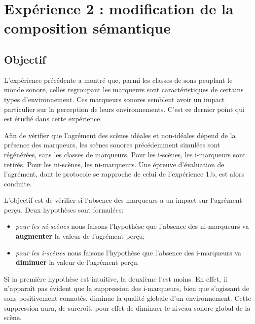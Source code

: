 \documentclass[twoside,twocolumn]{article}
\begin{document}

\section{Expérience 2 : modification de la composition sémantique}
\label{sec:xp3}

\subsection{Objectif} 

L'expérience précédente a montré que, parmi les classes de sons peuplant le monde sonore, celles regroupant les marqueurs sont caractéristiques de certains types d'environnement. Ces marqueurs sonores semblent avoir un impact particulier sur la perception de leurs environnements. C'est ce dernier point qui est étudié dans cette expérience.

Afin de vérifier que l'agrément des scènes idéales et non-idéales dépend de la présence des marqueurs, les scènes sonores précédemment simulées sont régénérées, sans les classes de marqueurs. Pour les i-scènes, les i-marqueurs sont retirés. Pour les ni-scènes, les ni-marqueurs. Une épreuve d'évaluation de l'agrément, dont le protocole se rapproche de celui de l'expérience 1.b, est alors conduite.

L'objectif est de vérifier si l'absence des marqueurs a un impact sur l'agrément perçu. Deux hypothèses sont formulées:

\begin{itemize}
\item \emph{pour les ni-scènes} nous faisons l'hypothèse que l'absence des ni-marqueurs va \textbf{augmenter} la valeur de l'agrément perçu;
\item \emph{pour les i-scènes} nous faisons l'hypothèse que l'absence des i-marqueurs va \textbf{diminuer} la valeur de l'agrément perçu.
\end{itemize}

Si la première hypothèse est intuitive, la deuxième l'est moins. En effet, il n’apparaît pas évident que la suppression des i-marqueurs, bien que s'agissant de sons positivement connotés, diminue la qualité globale d'un environnement. Cette suppression aura, de surcroît, pour effet de diminuer le niveau sonore global de la scène. 
\end{document}
